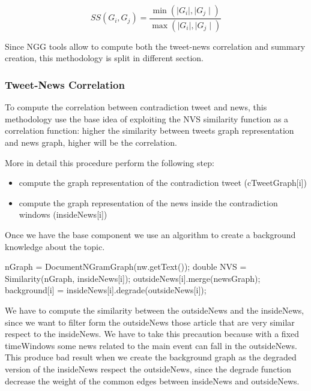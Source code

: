 \begin{equation}
 SS(G_i,G_j)=\frac{\min(\mid G_i \mid, \mid G_j \mid)}{\max(\mid G_i \mid, \mid G_j \mid)}
\end{equation}

Since NGG tools allow to compute both the tweet-news correlation and summary creation, this methodology is split in different section.

\subsubsection*{Tweet-News Correlation}
To compute the correlation between contradiction tweet and news, this methodology use the base idea of exploiting the NVS similarity function as a correlation function: higher the similarity between tweets graph representation and news graph, higher will be the correlation.

More in detail this procedure perform the following step:
\begin{itemize}
	\item compute the graph representation of the contradiction tweet (cTweetGraph[i])
	\item compute the  graph representation of the news inside the contradiction windows (insideNews[i])
\end{itemize}

Once we have the base component we use an algorithm to create a background knowledge about the topic.

\begin{algorithmic}
		\STATE nGraph = DocumentNGramGraph(nw.getText());
		\STATE double NVS = Similarity(nGraph, insideNews[i]);
			\STATE outsideNews[i].merge(newsGraph);
		\ENDIF
	\ENDIF
\ENDFOR
\STATE background[i] = insideNews[i].degrade(outsideNews[i]);
\end{algorithmic}

We have to compute the similarity between the outsideNews and the insideNews, since we want to filter form the outsideNews those article that are very similar respect to the insideNews.
We have to take this precaution because with a fixed timeWindows some news related to the main event can fall in the outsideNews.
This produce bad result when we create the background graph as the degraded version of the insideNews respect the outsideNews, since the degrade function decrease the weight of the common edges between insideNews and outsideNews.

